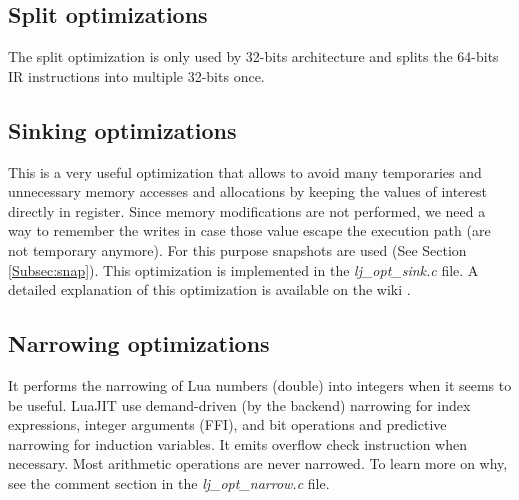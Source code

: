 
\subsection{Split optimizations}
\label{Subsec:opt-split}

The split optimization is only used by 32-bits architecture and splits the
64-bits IR instructions into multiple 32-bits once.


\subsection{Sinking optimizations}
\label{Subsec:opt-sinking}
This is a very useful optimization that allows to avoid many temporaries and
unnecessary memory accesses and allocations by keeping the values of interest
directly in register. Since memory modifications are not performed, we need a way
to remember the writes in case those value escape the execution path
(are not temporary anymore). For this purpose snapshots are used (See Section \ref{Subsec:snap}).
This optimization is implemented in the \emph{lj\_opt\_sink.c} file. A detailed
explanation of this optimization is available on the wiki \cite{luajit-sink}.


\subsection{Narrowing optimizations}
\label{Subsec:narrowing}

It performs the narrowing of Lua numbers (double) into integers when it seems
to be useful. LuaJIT use demand-driven (by the backend) narrowing for index
expressions, integer arguments (FFI), and bit operations and predictive
narrowing for induction variables. It emits overflow check instruction when
necessary. Most arithmetic operations are never narrowed. To learn more on why,
see the comment section in the \emph{lj\_opt\_narrow.c} file.

